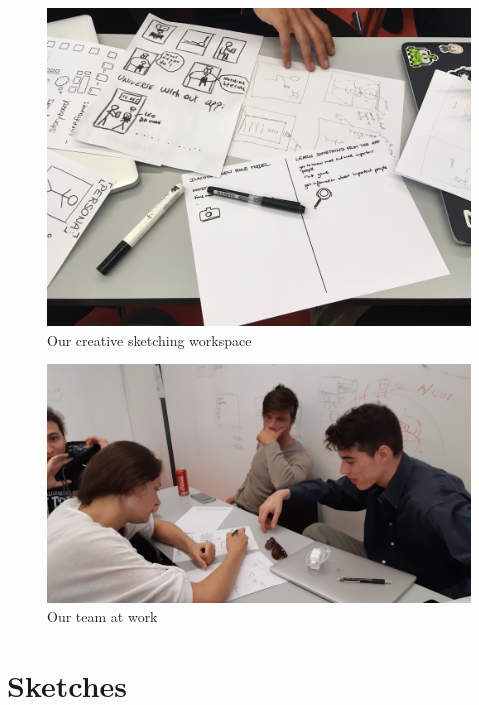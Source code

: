 \documentclass[12pt]{scrartcl}
\begin{document}
	\begin{figure}[H]
        		\centering
       		\includegraphics[width=\textwidth]{../images/group1.jpg}
       		\caption{Our creative sketching workspace}
        		\label{group1}
	\end{figure}
	
	\begin{figure}[H]
        		\centering
       		\includegraphics[width=\textwidth]{../images/group2.jpg}
       		\caption{Our team at work}
        		\label{group2}
	\end{figure}
	
	
\section{Sketches}
	
	
\end{document}
